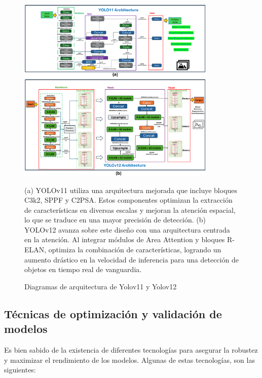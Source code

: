 \documentclass[12pt,a4paper,onecolumn,oneside]{report}
\begin{document}
\begin{figure}[htbp]
  \centering
  \includegraphics[width=0.85\textwidth]{figuras/arquitecture YOLO/v11_v12.png}
  \caption{Diagramas de arquitectura de Yolov11 y Yolov12}
  \label{fig:Yolov11_v12_arquitectures}
  (a) YOLOv11 utiliza una arquitectura mejorada que incluye bloques C3k2, SPPF y C2PSA. Estos componentes optimizan la extracción de características en diversas escalas y mejoran la atención espacial, lo que se traduce en una mayor precisión de detección.
  (b) YOLOv12 avanza sobre este diseño con una arquitectura centrada en la atención. Al integrar módulos de Area Attention y bloques R-ELAN, optimiza la combinación de características, logrando un aumento drástico en la velocidad de inferencia para una detección de objetos en tiempo real de vanguardia.
\end{figure}

\subsection{Técnicas de optimización y validación de modelos}

Es bien sabido de la existencia de diferentes tecnologías para asegurar la robustez y maximizar el rendimiento de los modelos. Algunas de estas tecnologías, son las siguientes:
\end{document}
